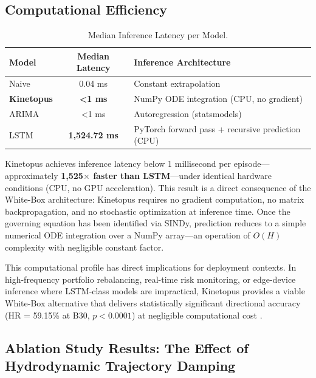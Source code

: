 \documentclass[11pt,a4paper]{article}
\begin{document}
\subsection{Computational Efficiency}

\begin{table}[H]
\centering
\small
\caption{Median Inference Latency per Model.}
\label{tab:latency}
\begin{tabular}{lcl}
\toprule
\textbf{Model} & \textbf{Median Latency} & \textbf{Inference Architecture} \\
\midrule
Naive & 0.04 ms & Constant extrapolation \\
\textbf{Kinetopus} & \textbf{<1 ms} & NumPy ODE integration (CPU, no gradient) \\
ARIMA & <1 ms & Autoregression (statsmodels) \\
LSTM & \textbf{1,524.72 ms} & PyTorch forward pass + recursive prediction (CPU) \\
\bottomrule
\end{tabular}
\end{table}

Kinetopus achieves inference latency below 1 millisecond per episode---approximately \textbf{1,525$\times$ faster than LSTM}---under identical hardware conditions (CPU, no GPU acceleration). This result is a direct consequence of the White-Box architecture: Kinetopus requires no gradient computation, no matrix backpropagation, and no stochastic optimization at inference time. Once the governing equation has been identified via SINDy, prediction reduces to a simple numerical ODE integration over a NumPy array---an operation of $O(H)$ complexity with negligible constant factor.

This computational profile has direct implications for deployment contexts. In high-frequency portfolio rebalancing, real-time risk monitoring, or edge-device inference where LSTM-class models are impractical, Kinetopus provides a viable White-Box alternative that delivers statistically significant directional accuracy (HR = 59.15\% at B30, $p < 0.0001$) at negligible computational cost \cite{chen2018neural}.

\subsection{Ablation Study Results: The Effect of Hydrodynamic Trajectory Damping}
\label{sec:ablation_results}
\end{document}
